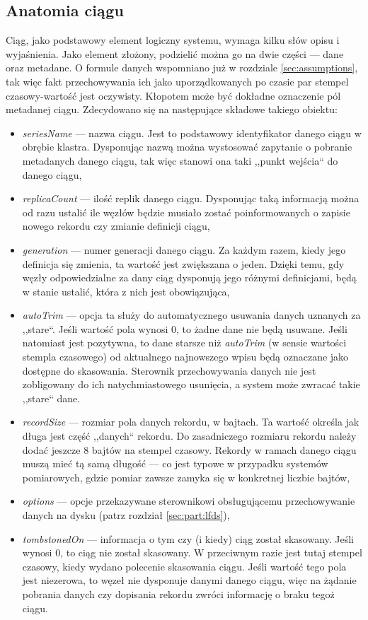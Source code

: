 \documentclass[a4paper,polish,12pt,twoside]{article}
\begin{document}
\subsection{Anatomia ciągu}
	\label{sec:anatomy}
	Ciąg, jako podstawowy element logiczny systemu, wymaga kilku słów opisu i wyjaśnienia. Jako element złożony, podzielić można go na dwie części --- dane oraz metadane. O formule danych wspomniano już w rozdziale \ref{sec:assumptions}, tak więc fakt przechowywania ich jako uporządkowanych po czasie par stempel czasowy-wartość jest oczywisty. Kłopotem może być dokładne oznaczenie pól metadanej ciągu. Zdecydowano się na następujące składowe takiego obiektu:
	\begin{itemize}
		\item \textit{seriesName} --- nazwa ciągu. Jest to podstawowy identyfikator danego ciągu w obrębie klastra. Dysponując nazwą można wystosować zapytanie o pobranie metadanych danego ciągu, tak więc stanowi ona taki ,,punkt wejścia`` do danego ciągu,
		\item \textit{replicaCount} --- ilość replik danego ciągu. Dysponując taką informacją można od razu ustalić ile węzłów będzie musiało zostać poinformowanych o zapisie nowego rekordu czy zmianie definicji ciągu,
		\item \textit{generation} --- numer generacji danego ciągu. Za każdym razem, kiedy jego definicja się zmienia, ta wartość jest zwiększana o jeden. Dzięki temu, gdy węzły odpowiedzialne za dany ciąg dysponują jego różnymi definicjami, będą w stanie ustalić, która z nich jest obowiązująca,
		\item \textit{autoTrim} --- opcja ta służy do automatycznego usuwania danych uznanych za ,,stare``. Jeśli wartość pola wynosi 0, to żadne dane nie będą usuwane. Jeśli natomiast jest pozytywna, to dane starsze niż \textit{autoTrim} (w sensie wartości stempla czasowego) od aktualnego najnowszego wpisu będą oznaczane jako dostępne do skasowania. Sterownik przechowywania danych nie jest zobligowany do ich natychmiastowego usunięcia, a system może zwracać takie ,,stare`` dane.
		\item \textit{recordSize} --- rozmiar pola danych rekordu, w bajtach. Ta wartość określa jak długa jest część ,,danych`` rekordu. Do zasadniczego rozmiaru rekordu należy dodać jeszcze 8 bajtów na stempel czasowy. Rekordy w ramach danego ciągu muszą mieć tą samą długość --- co jest typowe w przypadku systemów pomiarowych, gdzie pomiar zawsze zamyka się w konkretnej liczbie bajtów,
		\item \textit{options} --- opcje przekazywane sterownikowi obsługującemu przechowywanie danych na dysku (patrz rozdział \ref{sec:part:lfds}),
		\item \textit{tombstonedOn} --- informacja o tym czy (i kiedy) ciąg został skasowany. Jeśli wynosi 0, to ciąg nie został skasowany. W przeciwnym razie jest tutaj stempel czasowy, kiedy wydano polecenie skasowania ciągu. Jeśli wartość tego pola jest niezerowa, to węzeł nie dysponuje danymi danego ciągu, więc na żądanie pobrania danych czy dopisania rekordu zwróci informację o braku tegoż ciągu.
	\end{itemize}
\end{document}
